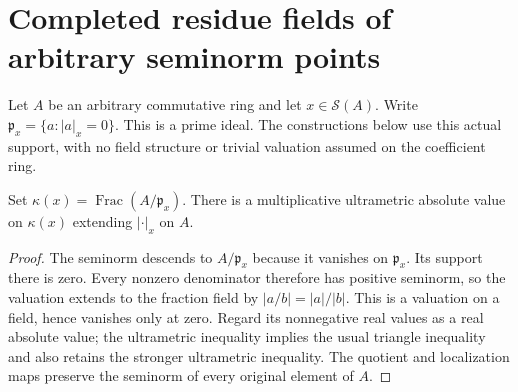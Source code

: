 \section{Completed residue fields of arbitrary seminorm points}
\label{sec:general-residue-fields}

Let $A$ be an arbitrary commutative ring and let $x\in\mathcal S(A)$.
Write $\mathfrak p_x=\{a:|a|_x=0\}$. This is a prime ideal. The
constructions below use this actual support, with no field structure or
trivial valuation assumed on the coefficient ring.

\begin{definition}
\label{spectrum:residue-field}
\leanok
{}
Set $\kappa(x)=\operatorname{Frac}(A/\mathfrak p_x)$.
There is a multiplicative ultrametric absolute value on $\kappa(x)$
extending $|\cdot|_x$ on $A$.
\end{definition}
\begin{proof}
The seminorm descends to $A/\mathfrak p_x$ because it vanishes on
$\mathfrak p_x$. Its support there is zero. Every nonzero denominator
therefore has positive seminorm, so the valuation extends to the fraction
field by $|a/b|=|a|/|b|$. This is a valuation on a field, hence vanishes
only at zero. Regard its nonnegative real values as a real absolute value;
the ultrametric inequality implies the usual triangle inequality and also
retains the stronger ultrametric inequality. The quotient and localization
maps preserve the seminorm of every original element of $A$.
\end{proof}

